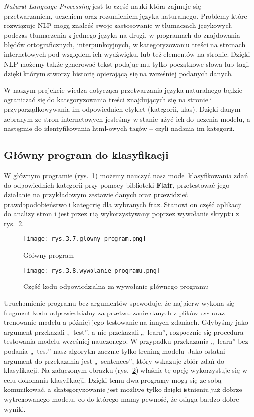 \emph{Natural Language Processing} jest to część nauki która zajmuje się przetwarzaniem, uczeniem oraz rozumieniem języka naturalnego. Problemy które rozwiązuje NLP mogą znaleźć swoje zastosowanie w tłumaczach językowych podczas tłumaczenia z jednego języka na drugi, w programach do znajdowania błędów ortograficznych, interpunkcyjnych, w kategoryzowaniu treści na stronach internetowych pod względem ich wydźwięku, lub też elementów na stronie. Dzięki NLP możemy także generować tekst podając mu tylko początkowe słowa lub tagi, dzięki którym stworzy historię opierającą się na wcześniej podanych danych.
    
W naszym projekcie wiedza dotycząca przetwarzania języka naturalnego będzie ograniczać się do kategoryzowania treści znajdujących się na stronie i przyporządkowywania im odpowiednich etykiet (kategorii, klas). Dzięki danym zebranym ze stron internetowych jesteśmy w stanie użyć ich do uczenia modelu, a następnie do identyfikowania html-owych tagów – czyli nadania im kategorii.


\subsection{Główny program do klasyfikacji}
\label{sec:3.2.1}

W głównym programie (rys.~\ref{fig:3.7}) możemy nauczyć nasz model klasyfikowania zdań do odpowiednich kategorii przy pomocy biblioteki \textbf{Flair}, przetestować jego działanie na przykładowym zestawie danych oraz przewidzieć prawdopodobieństwo i kategorię dla wybranych fraz. Stanowi on część aplikacji do analizy stron i jest przez nią wykorzystywany poprzez wywołanie skryptu z rys.~\ref{fig:3.8}.
\begin{figure}[h]
    \centering
    \texttt{[image: rys.3.7.glowny-program.png]}
    \caption{Główny program}
    \label{fig:3.7}
\end{figure}
\begin{figure}[h]
    \centering
    \texttt{[image: rys.3.8.wywolanie-programu.png]}
    \caption{Część kodu odpowiedzialna za wywołanie głównego programu}
    \label{fig:3.8}
\end{figure}
Uruchomienie programu bez argumentów spowoduje, że najpierw wykona się fragment kodu odpowiedzialny za przetwarzanie danych z plików csv oraz trenowanie modelu a później jego testowanie na innych zdaniach. Gdybyśmy jako argument przekazali „--test”, a nie przekazali „--learn”, rozpocznie się procedura testowania modelu wcześniej nauczonego. W przypadku przekazania „--learn” bez podania „--test” nasz algorytm zacznie tylko trening modelu. Jako ostatni argument do przekazania jest „--sentences”, który wskazuje zbiór zdań do klasyfikacji. Na załączonym obrazku (rys.~\ref{fig:3.8}) właśnie tę opcję wykorzystuje się w celu dokonania klasyfikacji. Dzięki temu dwa programy mogą się ze sobą komunikować, a skategoryzowanie jest możliwe tylko dzięki istnieniu już dobrze wytrenowanego modelu, co do którego mamy pewność, że osiąga bardzo dobre wyniki.


